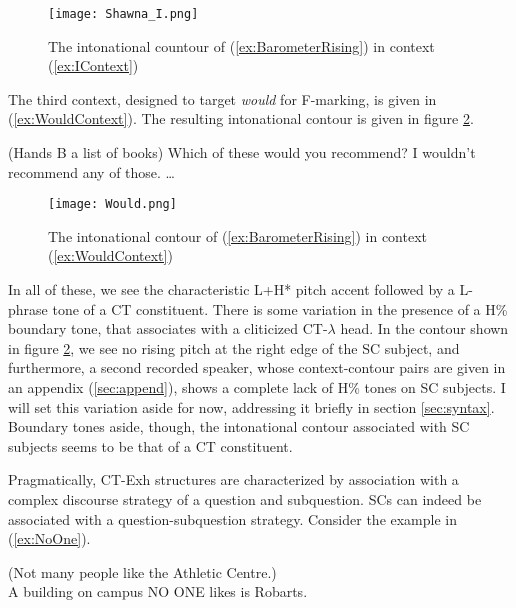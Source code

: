 \documentclass[
]{RCL}
\begin{document}
\begin{figure}[h]
	\centering
	\texttt{[image: Shawna\_I.png]}
	\caption{The intonational countour of (\ref{ex:BarometerRising}) in context (\ref{ex:IContext})}
	\label{fig:IContour}
\end{figure}
\FloatBarrier
The third context, designed to target \textit{would} for F-marking, is given in (\ref{ex:WouldContext}).
The resulting intonational contour is given in figure \ref{fig:WouldContour}.
\begin{exe}
\ex\label{ex:WouldContext}
\begin{xlist}
	 (Hands B a list of books) Which of these would you recommend?
	 I wouldn't recommend any of those. \dots
\end{xlist}	
\end{exe}

\begin{figure}[h]
	\centering
	\texttt{[image: Would.png]}
	\caption{The intonational contour of (\ref{ex:BarometerRising}) in context (\ref{ex:WouldContext})}
	\label{fig:WouldContour}
\end{figure}
\FloatBarrier
In all of these, we see the characteristic L+H* pitch accent followed by a L- phrase tone of a CT constituent. 
There is some variation in the presence of a H\% boundary tone, that \citet{constant2014diss} associates with a cliticized CT-$\lambda$ head.
In the contour shown in figure \ref{fig:WouldContour}, we see no rising pitch at the right edge of the SC subject, and furthermore, a second recorded speaker, whose context-contour pairs are given in an appendix (\ref{sec:append}), shows a complete lack of H\% tones on SC subjects. 
I will set this variation aside for now, addressing it briefly in section \ref{sec:syntax}.
Boundary tones aside, though, the intonational contour associated with SC subjects seems to be that of a CT constituent.

Pragmatically, CT-Exh structures are characterized by association with a complex discourse strategy of a question and subquestion.
SCs can indeed be associated with a question-subquestion strategy.
Consider the example in (\ref{ex:NoOne}).
\begin{exe}
	\ex\label{ex:NoOne} (Not many people like the Athletic Centre.)\\
	A building on campus NO ONE likes is Robarts.	
\end{exe}
\end{document}
